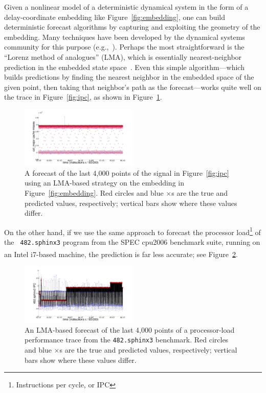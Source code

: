\documentclass{article}
\begin{document}
Given a nonlinear model of a deterministic dynamical system in the
form of a delay-coordinate embedding like Figure~\ref{fig:embedding},
one can build deterministic forecast algorithms by capturing and
exploiting the geometry of the embedding.  Many techniques have been
developed by the dynamical systems community for this purpose
(e.g.,~\cite{casdagli-eubank92,weigend-book}).  Perhaps the most straightforward
is the ``Lorenz method of analogues'' (LMA), which is essentially
nearest-neighbor prediction in the embedded state
space~\cite{lorenz-analogues}.  Even this simple algorithm---which
builds predictions by finding the nearest neighbor in the embedded
space of the given point, then taking that neighbor's path as the
forecast---works quite well on the trace in Figure~\ref{fig:ipc}, as
shown in Figure~\ref{fig:cachePredTS}.
%
\begin{figure}[htbp]
  \centering
    \includegraphics[width=0.5\textwidth]{figs/colCachePredTS}
    \caption{A forecast of the last 4,000 points of the signal in
      Figure~\ref{fig:ipc} using an LMA-based strategy on the
      embedding in Figure~\ref{fig:embedding}.  Red circles and blue
      $\times$s are the true and predicted values, respectively;
      vertical bars show where these values differ. }
\label{fig:cachePredTS}
\end{figure}
%
On the other hand, if we use the same approach to forecast the
processor load\footnote{Instructions per cycle, or IPC} of the {\tt
  482.sphinx3} program from the SPEC cpu2006 benchmark suite, running
on an Intel i7\textsuperscript{\textregistered}-based machine, the
prediction is far less accurate; see Figure~\ref{fig:predsphinx}.
%
\begin{figure}[htbp]
  \centering
    \includegraphics[width=0.5\textwidth]{figs/sphinxPredicTS}
     \caption{An LMA-based forecast of the last 4,000 points of a
       processor-load performance trace from the {\tt 482.sphinx3}
       benchmark.  Red circles and blue $\times$s are the true and
       predicted values, respectively; vertical bars show where these
       values differ.}
\label{fig:predsphinx}
\end{figure}
\end{document}
